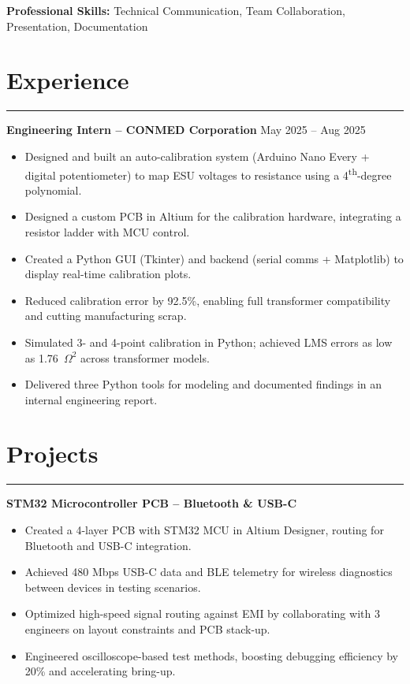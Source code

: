\documentclass[10pt]{article}
\newcommand{\sectionline}{\vspace{0.2em}\hrule\vspace{0.4em}}
\begin{document}
\textbf{Professional Skills:} Technical Communication, Team Collaboration, Presentation, Documentation


\section*{Experience}
\sectionline

\textbf{Engineering Intern – CONMED Corporation} \hfill May 2025 -- Aug 2025

\begin{itemize}
  \item Designed and built an auto-calibration system (Arduino Nano Every + digital potentiometer) to map ESU voltages to resistance using a 4\textsuperscript{th}-degree polynomial.
  \item Designed a custom PCB in Altium for the calibration hardware, integrating a resistor ladder with MCU control.
  \item Created a Python GUI (Tkinter) and backend (serial comms + Matplotlib) to display real-time calibration plots.
  \item Reduced calibration error by 92.5\%, enabling full transformer compatibility and cutting manufacturing scrap.
  \item Simulated 3- and 4-point calibration in Python; achieved LMS errors as low as 1.76~$\Omega^2$ across transformer models.
  \item Delivered three Python tools for modeling and documented findings in an internal engineering report.
\end{itemize}




\section*{Projects}
\sectionline

\textbf{STM32 Microcontroller PCB – Bluetooth \& USB-C}

\begin{itemize}
 \item Created a 4-layer PCB with STM32 MCU in Altium Designer, routing for Bluetooth and USB-C integration.
  \item Achieved 480 Mbps USB-C data and BLE telemetry for wireless diagnostics between devices in testing scenarios.
  \item Optimized high-speed signal routing against EMI by collaborating with 3 engineers on layout constraints and PCB stack-up.
  \item Engineered oscilloscope-based test methods, boosting debugging efficiency by 20\% and accelerating bring-up.
\end{itemize}
\end{document}
